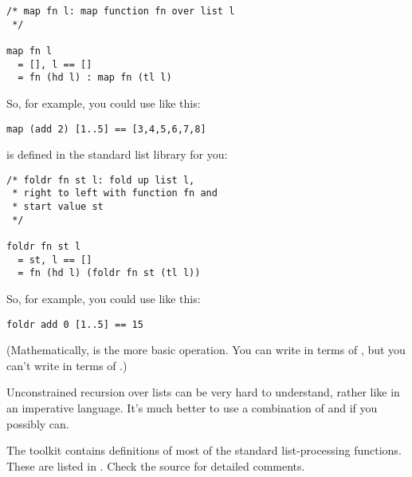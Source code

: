\begin{verbatim}
/* map fn l: map function fn over list l
 */

map fn l
  = [], l == []
  = fn (hd l) : map fn (tl l) 
\end{verbatim}

\noindent
So, for example, you could use  like this:

\begin{verbatim}
map (add 2) [1..5] == [3,4,5,6,7,8]
\end{verbatim}

 is defined in the standard list library for you:

\begin{verbatim}
/* foldr fn st l: fold up list l, 
 * right to left with function fn and 
 * start value st
 */
 
foldr fn st l
  = st, l == []
  = fn (hd l) (foldr fn st (tl l)) 
\end{verbatim}

\noindent
So, for example, you could use  like this:

\begin{verbatim}
foldr add 0 [1..5] == 15
\end{verbatim}

\noindent
(Mathematically,  is the more basic operation. You can write
 in terms of , but you can't write  in terms of
.)

Unconstrained recursion over lists can be very hard to understand, rather like
 in an imperative language. It's much better to use a combination of
 and  if you possibly can.

The toolkit  contains definitions of most of the standard
list-processing functions. These are listed in . Check the
source for detailed comments.

